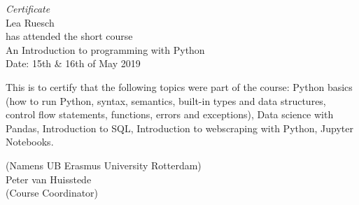 \documentclass[12pt,a4paper]{report}
\begin{document}
\newpage
\thispagestyle{empty}

\begin{center}

  \emph{\LARGE Certificate}\\[2.5cm]

  \Large{Lea Ruesch}\\[1.0cm]

  \normalsize{has attended the short course}\\[1.5cm]

  \LARGE{An Introduction to programming with Python}\\[1.0cm]

  \large{Date: 15th \& 16th of May 2019}\\[1.5cm]


\end{center}
\normalsize This is to certify that the following topics were part of
the course: Python basics (how to run Python, syntax, semantics,
built-in types and data structures, control flow statements, functions,
errors and exceptions), Data science with Pandas, Introduction to SQL,
Introduction to webscraping with Python, Jupyter Notebooks.\\[1.0cm]

\vfill


\begin{flushright}
(Namens UB Erasmus University Rotterdam)\\[0.5cm]
Peter van Huisstede\\
(Course Coordinator)\\
\end{flushright}
\end{document}
